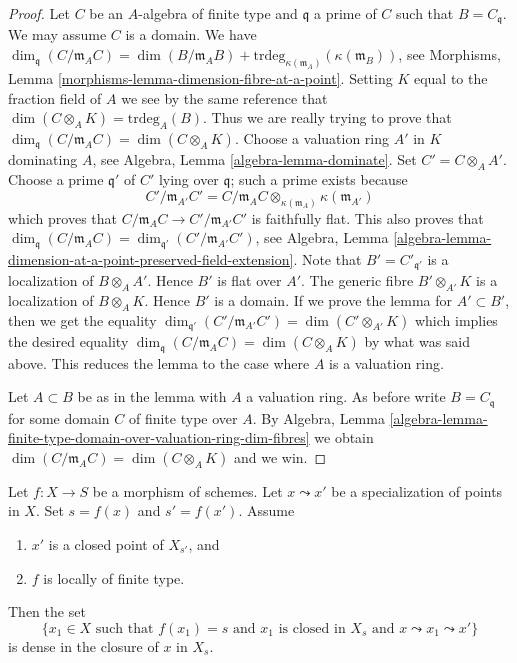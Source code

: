 \begin{proof}
Let $C$ be an $A$-algebra of finite type and $\mathfrak q$ a prime of $C$
such that $B = C_{\mathfrak q}$. We may assume $C$ is a domain.
We have
$\dim_{\mathfrak q}(C/\mathfrak m_AC) = \dim(B/\mathfrak m_AB) +
\text{trdeg}_{\kappa(\mathfrak m_A)}(\kappa(\mathfrak m_B))$, see
Morphisms, Lemma \ref{morphisms-lemma-dimension-fibre-at-a-point}.
Setting $K$ equal to the fraction field of $A$
we see by the same reference that
$\dim(C \otimes_A K) = \text{trdeg}_A(B)$.
Thus we are really trying to prove that
$\dim_{\mathfrak q}(C/\mathfrak m_AC) = \dim(C \otimes_A K)$.
Choose a valuation ring $A'$ in $K$ dominating $A$, see
Algebra, Lemma \ref{algebra-lemma-dominate}.
Set $C' = C \otimes_A A'$.
Choose a prime $\mathfrak q'$ of $C'$ lying over $\mathfrak q$; such a
prime exists because
$$
C'/\mathfrak m_{A'}C' =
C/\mathfrak m_AC \otimes_{\kappa(\mathfrak m_A)} \kappa(\mathfrak m_{A'})
$$
which proves that $C/\mathfrak m_AC \to C'/\mathfrak m_{A'}C'$ is faithfully
flat. This also proves that
$\dim_{\mathfrak q}(C/\mathfrak m_AC) =
\dim_{\mathfrak q'}(C'/\mathfrak m_{A'}C')$, see
Algebra,
Lemma \ref{algebra-lemma-dimension-at-a-point-preserved-field-extension}.
Note that $B' = C'_{\mathfrak q'}$ is a localization of $B \otimes_A A'$.
Hence $B'$ is flat over $A'$. The generic fibre $B' \otimes_{A'} K$
is a localization of $B \otimes_A K$. Hence $B'$ is a domain.
If we prove the lemma for $A' \subset B'$, then we get the equality
$\dim_{\mathfrak q'}(C'/\mathfrak m_{A'}C') = \dim(C' \otimes_{A'} K)$
which implies the desired equality
$\dim_{\mathfrak q}(C/\mathfrak m_AC) = \dim(C \otimes_A K)$
by what was said above. This reduces the
lemma to the case where $A$ is a valuation ring.

\medskip\noindent
Let $A \subset B$ be as in the lemma with $A$ a valuation ring.
As before write $B = C_{\mathfrak q}$ for some domain $C$ of finite
type over $A$. By
Algebra,
Lemma \ref{algebra-lemma-finite-type-domain-over-valuation-ring-dim-fibres}
we obtain $\dim(C/\mathfrak m_AC) = \dim(C \otimes_A K)$ and we win.
\end{proof}

\begin{lemma}
\label{lemma-closed-point-nearby-fibre}
Let $f : X \to S$ be a morphism of schemes.
Let $x \leadsto x'$ be a specialization of points in $X$.
Set $s = f(x)$ and $s' = f(x')$.
Assume
\begin{enumerate}
\item $x'$ is a closed point of $X_{s'}$, and
\item $f$ is locally of finite type.
\end{enumerate}
Then the set
$$
\{x_1 \in X
\text{ such that }
f(x_1) = s
\text{ and }
x_1\text{ is closed in }X_s
\text{ and }
x \leadsto x_1 \leadsto x'
\}
$$
is dense in the closure of $x$ in $X_s$.
\end{lemma}

